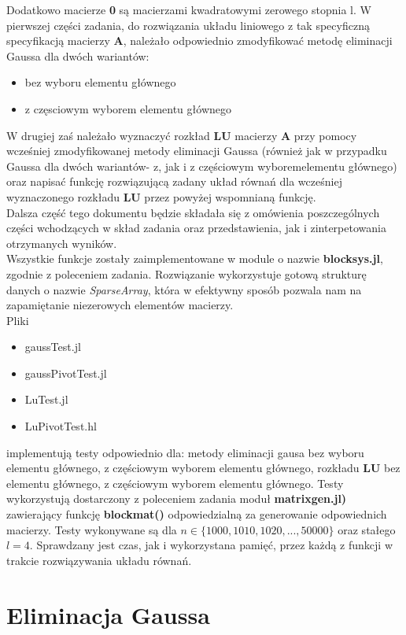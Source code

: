 \documentclass[a4paper,14pt]{report}
\begin{document}
  Dodatkowo macierze \textbf{0} są macierzami kwadratowymi zerowego stopnia l.
  W pierwszej części zadania, do rozwiązania układu liniowego z tak specyficzną specyfikacją macierzy \textbf{A}, należało odpowiednio zmodyfikować metodę eliminacji Gaussa dla dwóch wariantów:
  \begin{itemize}
    \item bez wyboru elementu głównego
    \item z częsciowym wyborem elementu głównego
  \end{itemize}
  W drugiej zaś należało wyznaczyć rozkład \textbf{LU} macierzy \textbf{A} przy pomocy wcześniej zmodyfikowanej metody eliminacji Gaussa (również jak w przypadku Gaussa dla dwóch wariantów- z, jak i z częściowym wyboremelementu głównego) oraz napisać funkcję rozwiązującą zadany układ równań dla wcześniej wyznaczonego rozkładu \textbf{LU} przez powyżej wspomnianą funkcję. \\
  Dalsza część tego dokumentu będzie składała się z omówienia poszczególnych części wchodzących w skład zadania oraz przedstawienia, jak i zinterpetowania otrzymanych wyników. \\
  Wszystkie funkcje zostały zaimplementowane w module o nazwie \textbf{blocksys.jl}, zgodnie z poleceniem zadania. Rozwiązanie wykorzystuje gotową strukturę danych o nazwie \textit{SparseArray}, która w efektywny sposób pozwala nam na zapamiętanie niezerowych elementów macierzy. \\
  Pliki
  \begin{itemize}
    \item gaussTest.jl
    \item gaussPivotTest.jl
    \item LuTest.jl
    \item LuPivotTest.hl
  \end{itemize}
  implementują testy odpowiednio dla: metody eliminacji gausa bez wyboru elementu głównego, z częściowym wyborem elementu głównego, rozkładu \textbf{LU} bez elementu głównego, z częściowym wyborem elementu głównego. 
  Testy wykorzystują dostarczony z poleceniem zadania moduł \textbf{matrixgen.jl)} zawierający funkcję \textbf{blockmat()} odpowiedzialną za generowanie odpowiednich macierzy. Testy wykonywane są dla $n \in \{1000,1010,1020,...,50000\}$ oraz stałego $l=4$. Sprawdzany jest czas, jak i wykorzystana pamięć, przez każdą z funkcji w trakcie rozwiązywania układu równań.
\chapter{Eliminacja Gaussa}
\end{document}

